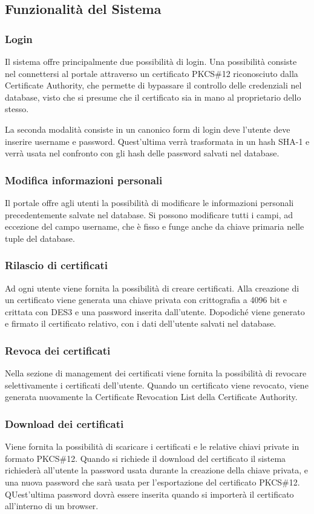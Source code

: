 \documentclass{article}
\begin{document}
\subsection{Funzionalità del Sistema}
\subsubsection*{Login}
Il sistema offre principalmente due possibilità di login. Una possibilità consiste nel connettersi al portale attraverso un certificato PKCS\#12 riconosciuto dalla Certificate Authority, che permette di bypassare il controllo delle credenziali nel database, visto che si presume che il certificato sia in mano al proprietario dello stesso.
\par La seconda modalità consiste in un canonico form di login deve l'utente deve inserire username e password. Quest'ultima verrà trasformata in un hash SHA-1 e verrà usata nel confronto con gli hash delle password salvati nel database.
\subsubsection*{Modifica informazioni personali}
Il portale offre agli utenti la possibilità di modificare le informazioni personali precedentemente salvate nel database. Si possono modificare tutti i campi, ad eccezione del campo username, che è fisso e funge anche da chiave primaria nelle tuple del database.
\subsubsection*{Rilascio di certificati}
Ad ogni utente viene fornita la possibilità di creare certificati. Alla creazione di un certificato viene generata una chiave privata con crittografia a 4096 bit e crittata con DES3 e una password inserita dall'utente. Dopodiché viene generato e firmato il certificato relativo, con i dati dell'utente salvati nel database.
\subsubsection*{Revoca dei certificati}
Nella sezione di management dei certificati viene fornita la possibilità di revocare selettivamente i certificati dell'utente. Quando un certificato viene revocato, viene generata nuovamente la Certificate Revocation List della Certificate Authority.
\subsubsection*{Download dei certificati}
Viene fornita la possibilità di scaricare i certificati e le relative chiavi private in formato PKCS\#12. Quando si richiede il download del certificato il sistema richiederà all'utente la password usata durante la creazione della chiave privata, e una nuova password che sarà usata per l'esportazione del certificato PKCS\#12. QUest'ultima password dovrà essere inserita quando si importerà il certificato all'interno di un browser.
\end{document}
